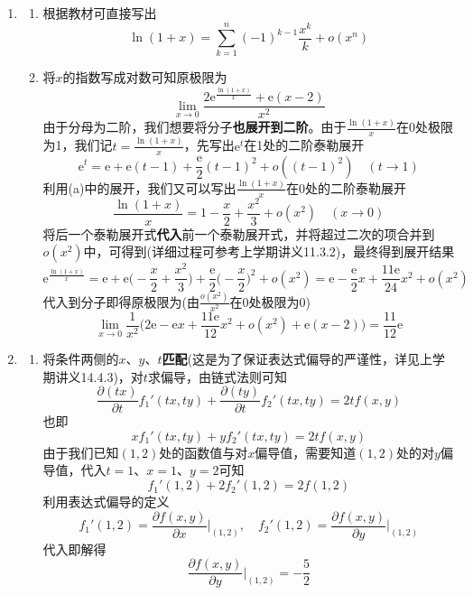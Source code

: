 \documentclass[a4paper,UTF8,fontset=windows,AutoFakeBold]{ctexart}
\newcommand*{\dr}{\hspace{0.07em}\mathrm{d}}
\newcommand*{\er}{\mathrm{e}}
\newcommand*{\note}{\noindent *}
\theoremstyle{ex}
\begin{document}
\begin{enumerate}
\begin{enumerate}
        对$F(x)$、$g(x)$应用柯西中值定理可得存在$\xi\in(2,4)$使得
        $$\frac{F'(\xi)}{g'(\xi)}=\frac{F(4)-F(2)}{g(4)-g(2)}$$
        代入计算可知
        $$\frac{f(\xi)}{\xi}=\frac{\int_2^4f(x)\dr x}{6}$$
        变形即得要证的结果。

        \item
        将(b)中$\xi$满足的条件改写为
        $$\xi\int_2^4f(x)\dr x=6f(\xi)$$
        代入即可将要证的式子化为存在$\eta\in(2,4)$、$\eta\ne\xi$使得
        $$f'(\eta)=\frac{f(\xi)}{\xi-2}$$
        由(a)中已经证明的$f(2)=0$，右侧即为$\frac{f(\xi)-f(2)}{\xi-2}$，直接通过\textbf{拉格朗日中值定理}可知存在$\eta\in(2,\xi)$符合要求。

        \note 本题的(c)并不依赖(b)的过程，且实际上比(b)更加简单。因此，考试时前面的小问没做出来仍然可以尝试后面的小问。
    \end{enumerate}

    \item
    \begin{enumerate}
        \item 
        根据教材可直接写出
        $$\ln(1+x)=\sum_{k=1}^n(-1)^{k-1}\frac{x^k}{k}+o(x^n)$$

        \item
        将$x$的指数写成对数可知原极限为
        $$\lim_{x\to0}\frac{2\er^{\frac{\ln(1+x)}{x}}+\er(x-2)}{x^2}$$
        由于分母为二阶，我们想要将分子\textbf{也展开到二阶}。由于$\frac{\ln(1+x)}{x}$在0处极限为1，我们记$t=\frac{\ln(1+x)}{x}$，先写出$\er^t$在1处的二阶泰勒展开
        $$\er^t=\er+\er(t-1)+\frac{\er}{2}(t-1)^2+o((t-1)^2)\quad(t\to1)$$
        利用(a)中的展开，我们又可以写出$\frac{\ln(1+x)}{x}$在0处的二阶泰勒展开
        $$\frac{\ln(1+x)}{x}=1-\frac{x}{2}+\frac{x^2}{3}+o(x^2)\quad(x\to0)$$
        将后一个泰勒展开式\textbf{代入}前一个泰勒展开式，并将超过二次的项合并到$o(x^2)$中，可得到(详细过程可参考上学期讲义11.3.2)，最终得到展开结果
        $$\er^{\frac{\ln(1+x)}{x}}=\er+\er\bigg(-\frac{x}{2}+\frac{x^2}{3}\bigg)+\frac{\er}{2}\bigg(-\frac{x}{2}\bigg)^2+o(x^2)=\er-\frac{\er}{2}x+\frac{11\er}{24}x^2+o(x^2)$$
        代入到分子即得原极限为(由$\frac{o(x^2)}{x^2}$在0处极限为0)
        $$\lim_{x\to0}\frac{1}{x^2}\bigg(2\er-\er x+\frac{11\er}{12}x^2+o(x^2)+\er(x-2)\bigg)=\frac{11}{12}\er$$
    \end{enumerate}

    \item
    \begin{enumerate}
        \item 
        将条件两侧的$x$、$y$、$t$\textbf{匹配}(这是为了保证表达式偏导的严谨性，详见上学期讲义14.4.3)，对$t$求偏导，由链式法则可知
        $$\frac{\partial(tx)}{\partial t}f_1'(tx,ty)+\frac{\partial(ty)}{\partial t}f_2'(tx,ty)=2tf(x,y)$$
        也即
        $$xf_1'(tx,ty)+yf_2'(tx,ty)=2tf(x,y)$$
        由于我们已知$(1,2)$处的函数值与对$x$偏导值，需要知道$(1,2)$处的对$y$偏导值，代入$t=1$、$x=1$、$y=2$可知
        $$f_1'(1,2)+2f_2'(1,2)=2f(1,2)$$
        利用表达式偏导的定义
        $$f_1'(1,2)=\frac{\partial f(x,y)}{\partial x}\bigg|_{(1,2)},\quad f_2'(1,2)=\frac{\partial f(x,y)}{\partial y}\bigg|_{(1,2)}$$
        代入即解得
        $$\frac{\partial f(x,y)}{\partial y}\bigg|_{(1,2)}=-\frac{5}{2}$$


\end{enumerate}
\end{enumerate}
\end{document}

